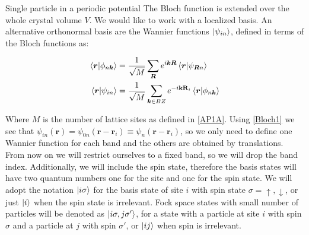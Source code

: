 \begin{section}{Single particle in a periodic potential}
The Bloch function is extended over the whole crystal volume $V$. We would like to work with a localized basis. An alternative orthonormal basis are the Wannier functions $\ket{\psi_{in}}$, defined in terms of the Bloch functions as:

\begin{align}
\bra{\boldsymbol{r}}\ket{\phi_{n\boldsymbol{k}}} &= \frac{1}{\sqrt{M}}\sum_{\boldsymbol{R}} e^{i\boldsymbol{k}\boldsymbol{R}} \bra{\boldsymbol{r}}\ket{\psi_{\boldsymbol{R}n}}  \label{Wannier1} \\
\bra{\boldsymbol{r}}\ket{\psi_{in}} &= \frac{1}{\sqrt{M}} \sum_{\boldsymbol{k}\in BZ} e^{-i\textbf{k}\textbf{R}_i} \bra{\boldsymbol{r}}\ket{\phi_{n\boldsymbol{k}}}\label{Wannier2}
\end{align}

Where $M$ is the number of lattice sites as defined in \ref{AP1A}. Using \ref{Bloch1} we see that $\psi_{in}(\textbf{r}) = \psi_{0n}(\textbf{r}-\textbf{r}_i) \equiv \psi_{n}(\textbf{r}-\textbf{r}_i)$, so we only need to define one Wannier function for each band and the others are obtained by translations. From now on we will restrict ourselves to a fixed band, so we will drop the band index. Additionally, we will include the spin state, therefore the basis states will have two quantum numbers one for the site and one for the spin state. We will adopt the notation $\ket{i\sigma}$ for the basis state of site $i$ with spin state $\sigma = \uparrow, \downarrow$, or just $\ket{i}$ when the spin state is irrelevant. Fock space states with small number of particles will be denoted as $\ket{i\sigma, j\sigma'}$, for a state with a particle at site $i$ with spin $\sigma$ and a particle at $j$ with spin $\sigma'$, or $\ket{ij}$ when spin is irrelevant.

\end{section}

